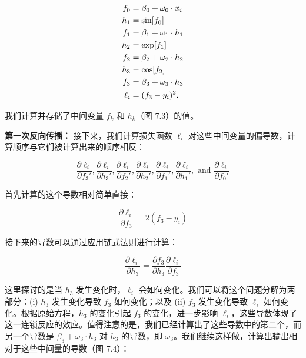 \documentclass[lang=cn,newtx,10pt,scheme=chinese]{elegantbook}
\begin{document}
\begin{align}
f_0 &= \beta_0 + \omega_0 \cdot x_i \notag \\
h_1 &= \sin[f_0] \notag \\
f_1 &= \beta_1 + \omega_1 \cdot h_1 \notag \\
h_2 &= \exp[f_1] \notag \\
f_2 &= \beta_2 + \omega_2 \cdot h_2 \notag \\
h_3 &= \cos[f_2] \notag \\
f_3 &= \beta_3 + \omega_3 \cdot h_3 \notag \\
\ell_i &= (f_3 - y_i)^2. 
\end{align} 

我们计算并存储了中间变量 \(f_k\) 和 \(h_k\)（图 7.3）的值。

\textbf{第一次反向传播：} 接下来，我们计算损失函数 \(\ell_i\) 对这些中间变量的偏导数，计算顺序与它们被计算出来的顺序相反：

\begin{equation}
\frac{\partial \ell_i}{\partial f_3'}, \frac{\partial \ell_i}{\partial h_3'}, \frac{\partial \ell_i}{\partial f_2'}, \frac{\partial \ell_i}{\partial h_2'}, \frac{\partial \ell_i}{\partial f_1'}, \frac{\partial \ell_i}{\partial h_1'}, \text{ and } \frac{\partial \ell_i}{\partial f_0'} 
\end{equation}

首先计算的这个导数相对简单直接：

\begin{equation}
\frac{\partial \ell_i}{\partial f_3} = 2(f_3 - y_i) 
\end{equation}

接下来的导数可以通过应用链式法则进行计算：

\begin{equation}
\frac{\partial \ell_i}{\partial h_3} = \frac{\partial f_3}{\partial h_3} \frac{\partial \ell_i}{\partial f_3} 
\end{equation}

这里探讨的是当 \(h_3\) 发生变化时，\(\ell_i\) 会如何变化。我们可以将这个问题分解为两部分：(i) \(h_3\) 发生变化导致 \(f_3\) 如何变化；以及 (ii) \(f_3\) 发生变化导致 \(\ell_i\) 如何变化。根据原始方程，\(h_3\) 的变化引起 \(f_3\) 的变化，进一步影响 \(\ell_i\)，这些导数体现了这一连锁反应的效应。值得注意的是，我们已经计算出了这些导数中的第二个，而另一个导数是 \(\beta_3 + \omega_3 \cdot h_3\) 对 \(h_3\) 的导数，即 \(\omega_3\)。我们继续这样做，计算出输出相对于这些中间量的导数（图 7.4）：
\end{document}

